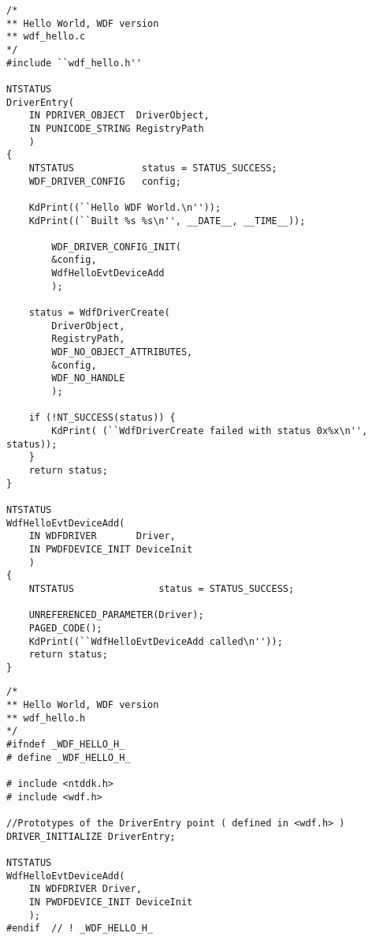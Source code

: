 \documentclass[11pt]{report}
\begin{document}
    \begin{lstlisting}
/*
** Hello World, WDF version
** wdf_hello.c
*/
#include ``wdf_hello.h''

NTSTATUS
DriverEntry(
    IN PDRIVER_OBJECT  DriverObject,
    IN PUNICODE_STRING RegistryPath
    )
{
    NTSTATUS            status = STATUS_SUCCESS;
    WDF_DRIVER_CONFIG   config;

    KdPrint((``Hello WDF World.\n''));
    KdPrint((``Built %s %s\n'', __DATE__, __TIME__));

        WDF_DRIVER_CONFIG_INIT(
        &config,
        WdfHelloEvtDeviceAdd
        );

    status = WdfDriverCreate(
        DriverObject,
        RegistryPath,
        WDF_NO_OBJECT_ATTRIBUTES,
        &config,
        WDF_NO_HANDLE
        );

    if (!NT_SUCCESS(status)) {
        KdPrint( (``WdfDriverCreate failed with status 0x%x\n'', status));
    }
    return status;
}

NTSTATUS
WdfHelloEvtDeviceAdd(
    IN WDFDRIVER       Driver,
    IN PWDFDEVICE_INIT DeviceInit
    )
{
    NTSTATUS               status = STATUS_SUCCESS;

    UNREFERENCED_PARAMETER(Driver);
    PAGED_CODE();
    KdPrint((``WdfHelloEvtDeviceAdd called\n''));
    return status;
}
    \end{lstlisting}
    \begin{lstlisting}
/*
** Hello World, WDF version
** wdf_hello.h
*/
#ifndef _WDF_HELLO_H_
# define _WDF_HELLO_H_

# include <ntddk.h>
# include <wdf.h>

//Prototypes of the DriverEntry point ( defined in <wdf.h> )
DRIVER_INITIALIZE DriverEntry;

NTSTATUS
WdfHelloEvtDeviceAdd(
    IN WDFDRIVER Driver,
    IN PWDFDEVICE_INIT DeviceInit
    );
#endif  // ! _WDF_HELLO_H_

    \end{lstlisting}
\end{document}
